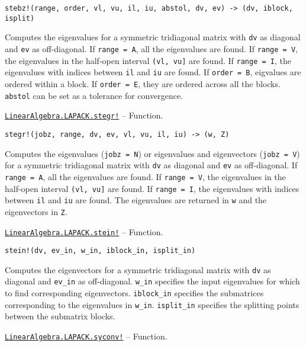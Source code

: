 \begin{adjustwidth}{2em}{0pt}


\begin{verbatim}
stebz!(range, order, vl, vu, il, iu, abstol, dv, ev) -> (dv, iblock, isplit)
\end{verbatim}

Computes the eigenvalues for a symmetric tridiagonal matrix with \texttt{dv} as diagonal and \texttt{ev} as off-diagonal. If \texttt{range = A}, all the eigenvalues are found. If \texttt{range = V}, the eigenvalues in the half-open interval \texttt{(vl, vu]} are found. If \texttt{range = I}, the eigenvalues with indices between \texttt{il} and \texttt{iu} are found. If \texttt{order = B}, eigvalues are ordered within a block. If \texttt{order = E}, they are ordered across all the blocks. \texttt{abstol} can be set as a tolerance for convergence.



\end{adjustwidth}
\hypertarget{18007684687736525555}{}
\hyperlink{18007684687736525555}{\texttt{LinearAlgebra.LAPACK.stegr!}}  -- {Function.}

\begin{adjustwidth}{2em}{0pt}


\begin{verbatim}
stegr!(jobz, range, dv, ev, vl, vu, il, iu) -> (w, Z)
\end{verbatim}

Computes the eigenvalues (\texttt{jobz = N}) or eigenvalues and eigenvectors (\texttt{jobz = V}) for a symmetric tridiagonal matrix with \texttt{dv} as diagonal and \texttt{ev} as off-diagonal. If \texttt{range = A}, all the eigenvalues are found. If \texttt{range = V}, the eigenvalues in the half-open interval \texttt{(vl, vu]} are found. If \texttt{range = I}, the eigenvalues with indices between \texttt{il} and \texttt{iu} are found. The eigenvalues are returned in \texttt{w} and the eigenvectors in \texttt{Z}.



\end{adjustwidth}
\hypertarget{4475992932708638755}{}
\hyperlink{4475992932708638755}{\texttt{LinearAlgebra.LAPACK.stein!}}  -- {Function.}

\begin{adjustwidth}{2em}{0pt}


\begin{verbatim}
stein!(dv, ev_in, w_in, iblock_in, isplit_in)
\end{verbatim}

Computes the eigenvectors for a symmetric tridiagonal matrix with \texttt{dv} as diagonal and \texttt{ev\_in} as off-diagonal. \texttt{w\_in} specifies the input eigenvalues for which to find corresponding eigenvectors. \texttt{iblock\_in} specifies the submatrices corresponding to the eigenvalues in \texttt{w\_in}. \texttt{isplit\_in} specifies the splitting points between the submatrix blocks.



\end{adjustwidth}
\hypertarget{7330295151672323275}{}
\hyperlink{7330295151672323275}{\texttt{LinearAlgebra.LAPACK.syconv!}}  -- {Function.}

